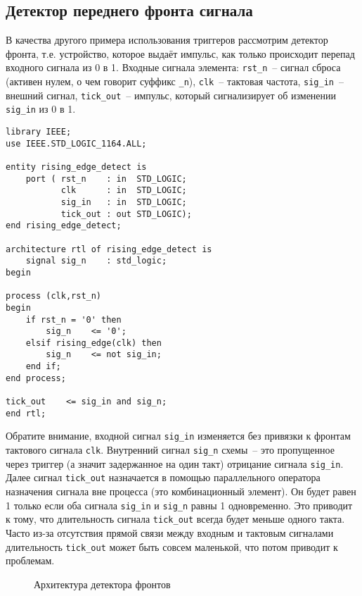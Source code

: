 \subsection{Детектор переднего фронта сигнала}

В качества другого примера использования триггеров рассмотрим детектор фронта, т.е. устройство, которое выдаёт импульс, как только происходит перепад входного сигнала из 0 в 1. Входные сигнала элемента: \lstinline?rst_n?~-- сигнал сброса (активен нулем, о чем говорит суффикс \lstinline?_n?), \lstinline?clk?~-- тактовая частота, \lstinline?sig_in?~-- внешний сигнал, \lstinline?tick_out?~-- импульс, который сигнализирует об изменении \lstinline?sig_in? из 0 в 1.

\begin{Code}
\begin{lstlisting}
library IEEE;
use IEEE.STD_LOGIC_1164.ALL;

entity rising_edge_detect is
    port ( rst_n    : in  STD_LOGIC;
           clk      : in  STD_LOGIC;
           sig_in   : in  STD_LOGIC;
           tick_out : out STD_LOGIC);
end rising_edge_detect;

architecture rtl of rising_edge_detect is
    signal sig_n    : std_logic;
begin

process (clk,rst_n)
begin
    if rst_n = '0' then
        sig_n    <= '0';
    elsif rising_edge(clk) then
        sig_n    <= not sig_in;
    end if;
end process;

tick_out    <= sig_in and sig_n; 
end rtl;
\end{lstlisting}
\end{Code}

Обратите внимание, входной сигнал \lstinline?sig_in? изменяется без привязки к фронтам тактового сигнала \lstinline?clk?. Внутренний сигнал \lstinline?sig_n? схемы~-- это пропущенное через триггер (а значит задержанное на один такт) отрицание сигнала \lstinline?sig_in?. Далее сигнал \lstinline?tick_out? назначается в помощью параллельного оператора назначения сигнала вне процесса (это комбинационный элемент). Он будет равен 1 только если оба сигнала \lstinline?sig_in? и \lstinline?sig_n? равны 1 одновременно. Это приводит к тому, что длительность сигнала \lstinline?tick_out? всегда будет меньше одного такта. Часто из-за отсутствия прямой связи между входным и тактовым сигналами длительность \lstinline?tick_out? может быть совсем маленькой, что потом приводит к проблемам.

\begin{figure}[ht]
\centering
{}
\caption{Архитектура детектора фронтов}
\label{register_arch}
\end{figure}


